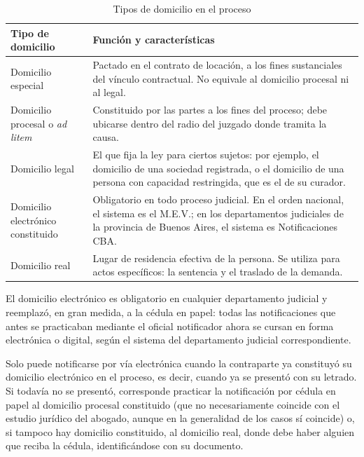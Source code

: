 \documentclass[12pt,oneside]{book}
\begin{document}
\begin{table}[H]
\centering
\caption{Tipos de domicilio en el proceso}
\begin{tabularx}{\textwidth}{>{\raggedright\arraybackslash}p{} X}
\toprule
\textbf{Tipo de domicilio} & \textbf{Función y características} \\
\midrule
Domicilio especial & Pactado en el contrato de locación, a los fines sustanciales del vínculo contractual. No equivale al domicilio procesal ni al legal. \\
Domicilio procesal o \emph{ad litem} & Constituido por las partes a los fines del proceso; debe ubicarse dentro del radio del juzgado donde tramita la causa. \\
Domicilio legal & El que fija la ley para ciertos sujetos: por ejemplo, el domicilio de una sociedad registrada, o el domicilio de una persona con capacidad restringida, que es el de su curador. \\
Domicilio electrónico constituido & Obligatorio en todo proceso judicial. En el orden nacional, el sistema es el M.E.V.; en los departamentos judiciales de la provincia de Buenos Aires, el sistema es Notificaciones CBA. \\
Domicilio real & Lugar de residencia efectiva de la persona. Se utiliza para actos específicos: la sentencia y el traslado de la demanda. \\
\bottomrule
\end{tabularx}
\end{table}

El domicilio electrónico es obligatorio en cualquier departamento judicial y reemplazó, en gran medida, a la cédula en papel: todas las notificaciones que antes se practicaban mediante el oficial notificador ahora se cursan en forma electrónica o digital, según el sistema del departamento judicial correspondiente.

\begin{important}
Solo puede notificarse por vía electrónica cuando la contraparte ya constituyó su domicilio electrónico en el proceso, es decir, cuando ya se presentó con su letrado. Si todavía no se presentó, corresponde practicar la notificación por cédula en papel al domicilio procesal constituido (que no necesariamente coincide con el estudio jurídico del abogado, aunque en la generalidad de los casos sí coincide) o, si tampoco hay domicilio constituido, al domicilio real, donde debe haber alguien que reciba la cédula, identificándose con su documento.
\end{important}
\end{document}
